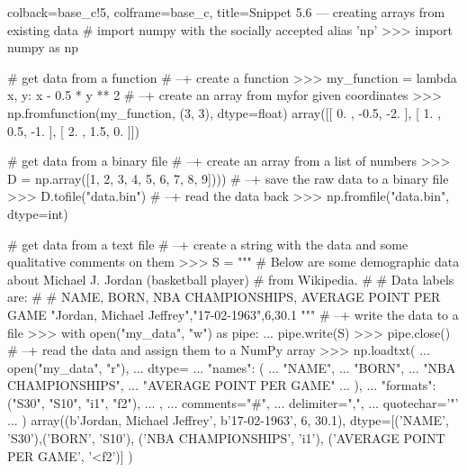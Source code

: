 \documentclass[a4paper,11pt]{book}
\numberwithin{figure}{chapter}
\numberwithin{table}{chapter}
\begin{document}
\begin{pythoncode}[linenos=true,]{colback=base_c!5, colframe=base_c, title=\sffamily Snippet 5.6 --- creating arrays from existing data}
# import numpy with the socially accepted alias 'np'
>>> import numpy as np

# get data from a function
# --+ create a function
>>> my_function = lambda x, y: x - 0.5 * y ** 2
# --+ create an array from my\fuction for given coordinates
>>> np.fromfunction(my_function, (3, 3), dtype=float)
array([[ 0. , -0.5, -2. ],
       [ 1. ,  0.5, -1. ],
       [ 2. ,  1.5,  0. ]])

# get data from a binary file
# --+ create an array from a list of numbers
>>> D = np.array([1, 2, 3, 4, 5, 6, 7, 8, 9])))
# --+ save the raw data to a binary file
>>> D.tofile("data.bin")
# --+ read the data back 
>>> np.fromfile("data.bin", dtype=int)

# get data from a text file
# --+ create a string with the data and some qualitative comments on them
>>> S = """
# Below are some demographic data about Michael J. Jordan (basketball player)
# from Wikipedia.
# 
# Data labels are:
# 
# NAME, BORN, NBA CHAMPIONSHIPS, AVERAGE POINT PER GAME
"Jordan, Michael Jeffrey","17-02-1963",6,30.1
"""
# --+ write the data to a file 
>>> with open("my_data", "w") as pipe:
...     pipe.write(S)
>>> pipe.close()
# --+ read the data and assign them to a NumPy array
>>> np.loadtxt(
...   open("my_data", "r"),
...       dtype={
...             "names": (
...                      "NAME",
...                      "BORN",
...                      "NBA CHAMPIONSHIPS",
...                      "AVERAGE POINT PER GAME"
...	                   ),
...             "formats": ("S30", "S10", "i1", "f2"),
...             },
...       comments="#",
...       delimiter=",",
...       quotechar='"'
...   )
array((b'Jordan, Michael Jeffrey', b'17-02-1963', 6, 30.1),
       dtype=[('NAME', 'S30'),('BORN', 'S10'),
             ('NBA CHAMPIONSHIPS', 'i1'),
             ('AVERAGE POINT PER GAME', '<f2')]
)
\end{pythoncode}
\end{document}
